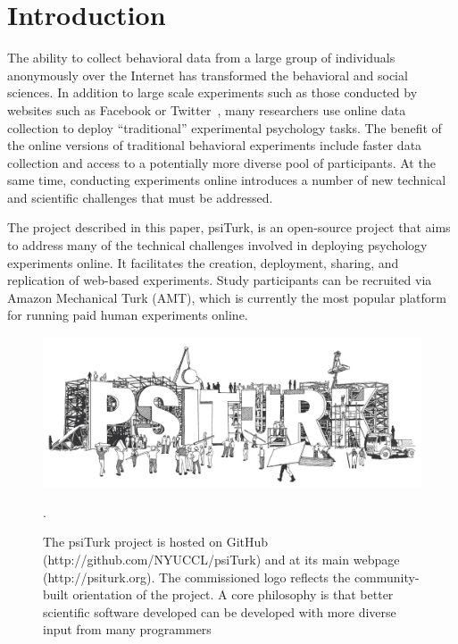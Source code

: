 \documentclass[twocolumn]{svjour3}          %
\newcommand{\psiturk}[0]{\textsf{psiTurk}}
\begin{document}

\section{Introduction}


The ability to collect behavioral data from a large group of individuals
anonymously over the Internet has transformed the behavioral and social
sciences.  In addition to large scale experiments such as those
conducted by websites such as Facebook or 
Twitter~\citep[e.g.,][]{Chen:2013pb,Kramer:2014dq,Wu:2011sp}, many researchers
use online data collection to deploy ``traditional'' experimental psychology
tasks.  The benefit of the online versions of traditional behavioral experiments include 
faster data collection and access to a potentially more diverse pool of participants. 
At the same time, conducting experiments online introduces a number of new 
technical and scientific challenges that must be addressed.

The project described in this paper, \psiturk{}, is an open-source project that aims to address many of the technical challenges
involved in deploying psychology experiments online.
It facilitates the creation, deployment, sharing, and replication of web-based experiments.
Study participants can be recruited via Amazon 
Mechanical Turk (AMT), which is currently the most popular platform for running 
paid human experiments online.

\begin{figure}[tp]
\centering
\includegraphics[scale=.30]{figures/psiturk_logo.jpg}
\caption{The \psiturk{} project is hosted on GitHub 
(\textsf{http://github.com/NYUCCL/psiTurk}) and at its main webpage (\textsf{http://psiturk.org}). 
The commissioned logo reflects the community-built orientation of the project.  A 
core philosophy is that better scientific software developed can be developed 
with more diverse input from many programmers~\citep{Raymond:1999zt}}.
\label{fig:logo}
\end{figure}
\end{document}
